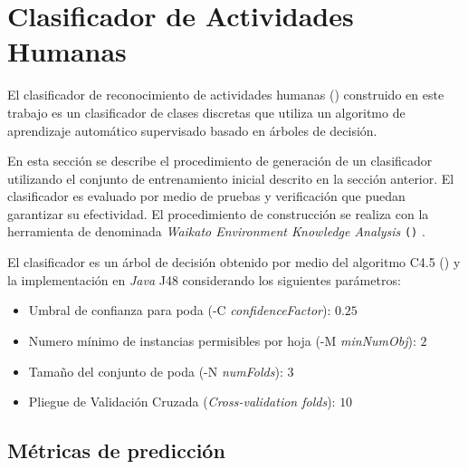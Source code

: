 \section{Clasificador de Actividades Humanas}

\label{sec6:clasificacion}El clasificador de reconocimiento de actividades
humanas () construido en este trabajo es un clasificador
de clases discretas que utiliza un algoritmo de aprendizaje automático
supervisado basado en árboles de decisión. 

En esta sección se describe el procedimiento de generación de un clasificador
 utilizando el conjunto de entrenamiento inicial descrito
en la sección anterior. El clasificador es evaluado por medio de pruebas
y verificación que puedan garantizar su efectividad. El procedimiento
de construcción se realiza con la herramienta de  denominada
\emph{Waikato Environment Knowledge Analysis} \texttt{()}
\cite{Frank2016}.

El clasificador es un árbol de decisión obtenido por medio del algoritmo
C4.5 () y la implementación en \emph{Java} J48 \cite{Frank2016b}
considerando los siguientes parámetros:
\begin{itemize}
\item Umbral de confianza para poda\emph{ }(-C\emph{ confidenceFactor}):
$0.25$
\item Numero mínimo de instancias permisibles por hoja\emph{ }(-M\emph{
minNumObj}): $2$
\item Tamaño del conjunto de poda\emph{ }(-N\emph{ numFolds}): $3$
\item Pliegue de Validación Cruzada\emph{ }(\emph{Cross-validation folds}):
$10$
\end{itemize}

\subsection{Métricas de predicción }

